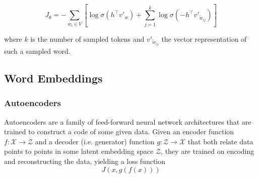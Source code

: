 \documentclass[6pt]{article}
\begin{document}
\begin{equation}
J_{\theta}  = - \sum_{w_i \in V} [\log \sigma(h^{\top}v'_w)
+ \sum_{j=1}^{k}\log \sigma(-h^{\top}v'_{\tilde{w}_{ij}})]
\label{eq:neg_sampling_3}
\end{equation}

where $k$ is the number of sampled tokens and $v'_{\tilde{w}_{ij}}$ the vector representation of such a sampled word.



\subsection{Word Embeddings}
\label{Word Embeddings}
\subsubsection{Autoencoders}

Autoencoders are a family of feed-forward neural network architectures that are trained to construct a code of some given data. Given an encoder function $f: \mathcal{X} \rightarrow \mathcal{Z}$ and a decoder (i.e. generator) function $g: \mathcal{Z} \rightarrow \mathcal{X}$ that both relate data points to points in some latent embedding space $\mathcal{Z}$, they are trained on encoding and reconstructing the data, yielding a loss function
\begin{equation}
J(x,g(f(x)))
\end{equation}
 
\end{document}
